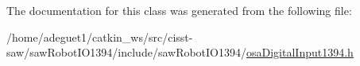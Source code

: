 

The documentation for this class was generated from the following file\-:\begin{DoxyCompactItemize}
\item 
/home/adeguet1/catkin\-\_\-ws/src/cisst-\/saw/saw\-Robot\-I\-O1394/include/saw\-Robot\-I\-O1394/\hyperlink{osa_digital_input1394_8h}{osa\-Digital\-Input1394.\-h}\end{DoxyCompactItemize}

